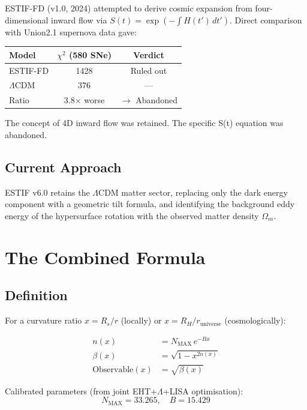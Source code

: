 \documentclass[12pt]{article}
\begin{document}
ESTIF-FD (v1.0, 2024) attempted to derive cosmic expansion from four-dimensional
inward flow via $S(t) = \exp(-\int H(t')\,dt')$. Direct comparison with Union2.1
supernova data gave:

\begin{center}
\begin{tabular}{lcc}
\toprule
Model & $\chi^2$ (580 SNe) & Verdict \\
\midrule
ESTIF-FD & 1428 & Ruled out \\
$\Lambda$CDM & 376 & --- \\
Ratio & 3.8$\times$ worse & $\longrightarrow$ Abandoned \\
\bottomrule
\end{tabular}
\end{center}

The concept of 4D inward flow was retained. The specific S(t) equation was abandoned.

\subsection{Current Approach}

ESTIF v6.0 retains the $\Lambda$CDM matter sector, replacing only the dark energy
component with a geometric tilt formula, and identifying the background eddy energy
of the hypersurface rotation with the observed matter density $\Omega_m$.

\section{The Combined Formula}

\subsection{Definition}

For a curvature ratio $x = R_s/r$ (locally) or $x = R_H/r_\text{universe}$ (cosmologically):

\begin{align}
n(x) &= N_\text{MAX}\, e^{-Bx} \label{eq:n} \\
\beta(x) &= \sqrt{1 - x^{2n(x)}} \label{eq:beta} \\
\text{Observable}(x) &= \sqrt{\beta(x)} \label{eq:obs}
\end{align}

Calibrated parameters (from joint EHT+$\Lambda$+LISA optimisation):
\begin{equation}
N_\text{MAX} = 33.265, \quad B = 15.429
\end{equation}
\end{document}
